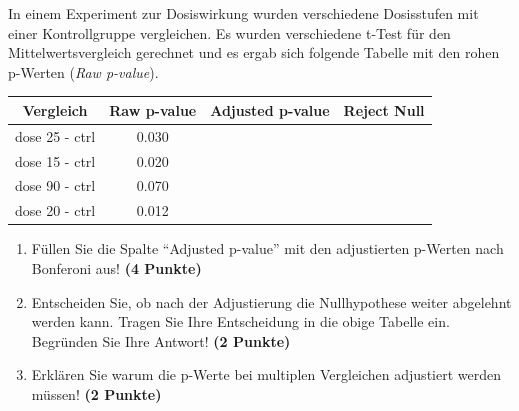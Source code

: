 \documentclass[a4paper, 9pt]{scrartcl}\usepackage[]{graphicx}\usepackage[]{xcolor}
\newenvironment{knitrout}{}{} %
\begin{document}
In einem Experiment zur Dosiswirkung wurden verschiedene Dosisstufen mit
einer Kontrollgruppe vergleichen. Es wurden verschiedene t-Test f{\"u}r den
Mittelwertsvergleich gerechnet und es ergab sich folgende Tabelle mit den
rohen p-Werten (\textit{Raw p-value}).


\begin{knitrout}
\color{fgcolor}\begin{table}[!h]
\centering\begingroup\fontsize{12}{14}\selectfont

\begin{tabular}{cccc}
\toprule
Vergleich & Raw p-value & Adjusted p-value & Reject Null\\
\midrule
dose 25 - ctrl & 0.030 &  & \\
dose 15 - ctrl & 0.020 &  & \\
dose 90 - ctrl & 0.070 &  & \\
dose 20 - ctrl & 0.012 &  & \\
\bottomrule
\end{tabular}
\endgroup{}
\end{table}

\end{knitrout}



\begin{enumerate}
\item F{\"u}llen Sie die Spalte "`Adjusted p-value"' mit den adjustierten
  p-Werten nach Bonferoni aus! \textbf{(4 Punkte)}
\item Entscheiden Sie, ob nach der Adjustierung die Nullhypothese weiter
  abgelehnt werden kann. Tragen Sie Ihre Entscheidung in die obige Tabelle
  ein. Begr{\"u}nden Sie Ihre Antwort! \textbf{(2 Punkte)}
\item Erkl{\"a}ren Sie warum die p-Werte bei multiplen Vergleichen
  adjustiert werden m{\"u}ssen! \textbf{(2 Punkte)}
\end{enumerate}
\end{document}
